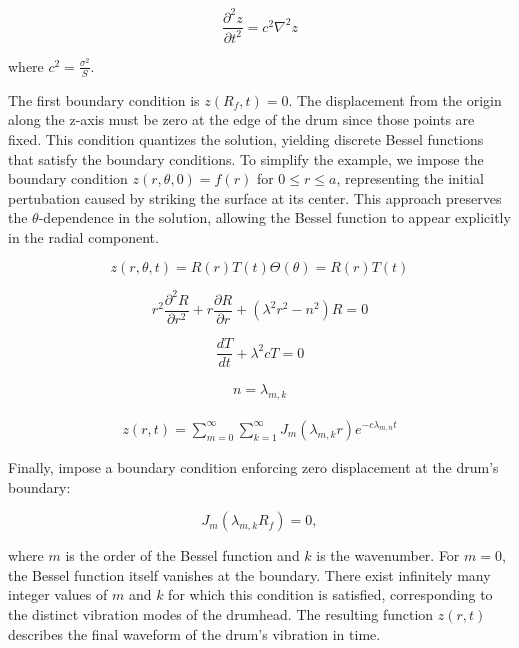 \documentclass[linenumbers, RNAAS, trackchanges]{aastex631}
\begin{document}
\begin{equation}
    \frac{\partial^2z}{\partial t^2}=c^2\nabla^2z
\end{equation}

\noindent where $c^2=\frac{\sigma^2}{S}$.

\noindent The first boundary condition is $z(R_f,t)=0$. The displacement from the origin
along the z-axis must be zero at the edge of the drum since those points are
fixed. This condition quantizes the solution, yielding discrete Bessel functions
that satisfy the boundary conditions. To simplify the example, we impose the boundary
condition $z(r,\theta,0)=f(r)$ for $0\leq r \leq a$, representing the initial
pertubation caused by striking the surface at its center. This approach preserves
the $\theta$-dependence in the solution, allowing the Bessel function to appear
explicitly in the radial component.

\begin{equation}
    z(r,\theta,t)=R(r)T(t)\Theta(\theta)=R(r)T(t)
\end{equation}

\begin{equation}
    r^2\frac{\partial^2R}{\partial r^2}+r\frac{\partial R}{\partial r}+(\lambda^2r^2-n^2)R=0
\end{equation}

\begin{equation}
    \frac{dT}{dt}+\lambda^2cT=0
\end{equation}

\begin{eqnarray}
    n=\lambda_{m,k}
\end{eqnarray}

\begin{eqnarray}
    z(r,t)=\sum_{m=0}^\infty \sum_{k=1}^\infty J_m(\lambda_{m,k}r)e^{-c\lambda_{m,n}t}
\end{eqnarray}

\noindent Finally, impose a boundary condition enforcing zero displacement at
the drum's boundary:

\begin{equation}
    J_m(\lambda_{m,k}R_f)=0,
\end{equation}

\noindent where $m$ is the order of the Bessel function and $k$ is the wavenumber.
For $m=0$, the Bessel function itself vanishes at the boundary. There exist infinitely
many integer values of $m$ and $k$ for which this condition is satisfied, corresponding
to the distinct vibration modes of the drumhead. The resulting function $z(r,t)$
describes the final waveform of the drum's vibration in time.
\end{document}
